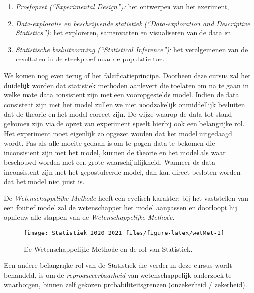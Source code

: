 \documentclass[
  12pt,dutch,coursenotes]{book}
\providecommand{\tightlist}{%
  \setlength{\itemsep}{0pt}\setlength{\parskip}{0pt}}
\theoremstyle{definition}
\theoremstyle{definition}
\theoremstyle{definition}
\theoremstyle{remark}
\begin{document}
\begin{itemize}
  \begin{enumerate}
  \def\labelenumi{\arabic{enumi}.}
  \tightlist
  \item
    \emph{Proefopzet (``Experimental Design''):} het ontwerpen van het exeriment,
  \item
    \emph{Data-exploratie en beschrijvende statistiek (``Data-exploration and Descriptive Statistics''):} het exploreren, samenvatten en visualiseren van de data en
  \item
    \emph{Statistische besluitvorming (``Statistical Inference''):} het veralgemenen van de resultaten in de steekproef naar de populatie toe.
  \end{enumerate}
\end{itemize}

We komen nog even terug of het falcificatieprincipe. Doorheen deze cursus zal het duidelijk worden dat statistiek methoden aanlevert die toelaten om na te gaan in welke mate data consistent zijn met een vooropgestelde model. Indien de data consistent zijn met het model zullen we niet noodzakelijk onmiddellijk besluiten dat de theorie en het model correct zijn. De wijze waarop de data tot stand gekomen zijn via de opzet van experiment speelt hierbij ook een belangrijke rol. Het experiment moet eigenlijk zo opgezet worden dat het model uitgedaagd wordt. Pas als alle moeite gedaan is om te pogen data te bekomen die inconsistent zijn met het model, kunnen de theorie en het model als waar beschouwd worden met een grote waarschijnlijkheid. Wanneer de data inconsistent zijn met het gepostuleerde model, dan kan direct besloten worden dat het model niet juist is.

De \emph{Wetenschappelijke Methode} heeft een cyclisch karakter: bij het vaststellen van een foutief model zal de wetenschapper het model aanpassen en doorloopt hij opnieuw alle stappen van de \emph{Wetenschappelijke Methode}.

\begin{figure}

{\centering \texttt{[image: Statistiek\_2020\_2021\_files/figure-latex/wetMet-1]} 

}

\caption{De Wetenschappelijke Methode en de rol van Statistiek.}\label{fig:wetMet}
\end{figure}

Een andere belangrijke rol van de Statistiek die verder in deze cursus wordt behandeld, is om de \emph{reproduceerbaarheid} van wetenschappelijk onderzoek te waarborgen, binnen zelf gekozen probabiliteitsgrenzen (onzekerheid / zekerheid).
\end{document}
